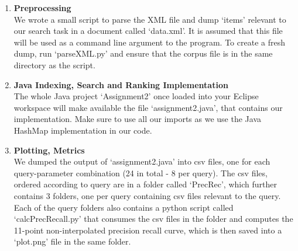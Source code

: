 \begin{enumerate}

\item {\bf Preprocessing} \\
We wrote a small script to parse the XML file and dump \lq items' relevant to our search task
in a document called \lq data.xml'. It is assumed that this file will be used as a command line
argument to the program. To create a fresh dump, run \lq parseXML.py' and ensure that the corpus
file is in the same directory as the script. 
\item {\bf Java Indexing, Search and Ranking Implementation} \\
The whole Java project \lq Assignment2' once loaded into your Eclipse workspace
will make available the file \lq assignment2.java', that contains our implementation. 
Make sure to use all our imports as we use the Java HashMap implementation in our code.
\item {\bf Plotting, Metrics} \\
We dumped the output of \lq assignment2.java' into csv files, one for each query-parameter
combination (24 in total - 8 per query). The csv files, ordered according to query are in
a folder called \lq PrecRec', which further contains 3 folders, one per query containing csv
files relevant to the query. Each of the query folders also contains a python script called \lq calcPrecRecall.py\rq 
that consumes the csv files in the folder and computes the 11-point non-interpolated precision recall curve,
which is then saved into a \lq plot.png' file in the same folder. 
\end{enumerate}

